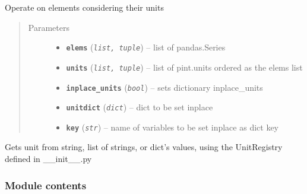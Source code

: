 \documentclass[a4paper,10pt,oneside]{sphinxmanual}
\begin{document}

\begin{fulllineitems}
\label{pymicra.algs:pymicra.algs.units.operate}
Operate on elements considering their units
\begin{quote}\begin{description}
\item[{Parameters}] \leavevmode\begin{itemize}
\item {} 
\textbf{\texttt{elems}} (\emph{\texttt{list, tuple}}) -- list of pandas.Series

\item {} 
\textbf{\texttt{units}} (\emph{\texttt{list, tuple}}) -- list of pint.units ordered as the elems list

\item {} 
\textbf{\texttt{inplace\_units}} (\emph{\texttt{bool}}) -- sets dictionary inplace\_units

\item {} 
\textbf{\texttt{unitdict}} (\emph{\texttt{dict}}) -- dict to be set inplace

\item {} 
\textbf{\texttt{key}} (\emph{\texttt{str}}) -- name of variables to be set inplace as dict key

\end{itemize}

\end{description}\end{quote}

\end{fulllineitems}


\begin{fulllineitems}
\label{pymicra.algs:pymicra.algs.units.parseUnits}
Gets unit from string, list of strings, or dict's values, using the UnitRegistry
defined in \_\_init\_\_.py

\end{fulllineitems}



\subsubsection{Module contents}
\label{pymicra.algs:module-pymicra.algs}\label{pymicra.algs:module-contents}
\end{document}
